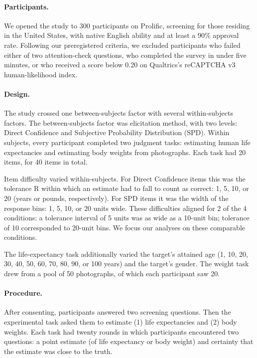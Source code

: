 \documentclass{article}
\begin{document}
\paragraph{Participants.} We opened the study to 300 participants on Prolific, screening for those residing in the United States, with native English ability and at least a 90\% approval rate. Following our preregistered criteria, we excluded participants who failed either of two attention-check questions, who completed the survey in under five minutes, or who received a score below 0.20 on Qualtrics's reCAPTCHA v3 human-likelihood index.  

\paragraph{Design.} The study crossed one between-subjects factor with several within-subjects factors. The between-subjects factor was elicitation method, with two levels: Direct Confidence and Subjective Probability Distribution (SPD). Within subjects, every participant completed two judgment tasks: estimating human life expectancies and estimating body weights from photographs. Each task had 20 items, for 40 items in total.

Item difficulty varied within-subjects. For Direct Confidence items this was the tolerance R within which an estimate had to fall to count as correct: 1, 5, 10, or 20 (years or pounds, respectively). For SPD items it was the width of the response bins: 1, 5, 10, or 20 units wide. These difficulties aligned for 2 of the 4 conditions: a tolerance interval of 5 units was as wide as a 10-unit bin; tolerance of 10 corresponded to 20-unit bins. We focus our analyses on these comparable conditions.

The life-expectancy task additionally varied the target's attained age (1, 10, 20, 30, 40, 50, 60, 70, 80, 90, or 100 years) and the target's gender. The weight task drew from a pool of 50 photographs, of which each participant saw 20.

\paragraph{Procedure.} After consenting, participants answered two screening questions. Then the experimental task asked them to estimate (1) life expectancies and (2) body weights. Each task had twenty rounds in which participants encountered two questions: a point estimate (of life expectancy or body weight) and certainty that the estimate was close to the truth.
\end{document}
